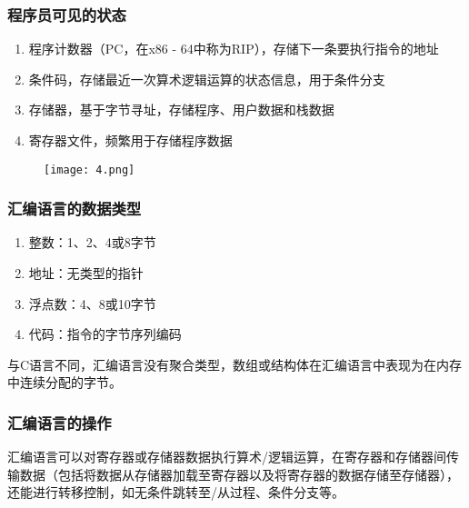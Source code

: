 \subsubsection{程序员可见的状态}
\begin{enumerate}
    \item 程序计数器（PC，在x86 - 64中称为RIP），存储下一条要执行指令的地址
    \item 条件码，存储最近一次算术逻辑运算的状态信息，用于条件分支
    \item 存储器，基于字节寻址，存储程序、用户数据和栈数据
    \item 寄存器文件，频繁用于存储程序数据
\end{enumerate}

\begin{figure}[H]
    \centering
    \captionsetup{skip=4pt}
    \texttt{[image: 4.png]}
    \caption{}
\end{figure}


\subsubsection{汇编语言的数据类型}
\begin{enumerate}
    \item 整数：1、2、4或8字节
    \item 地址：无类型的指针
    \item 浮点数：4、8或10字节
    \item 代码：指令的字节序列编码
\end{enumerate}
与C语言不同，汇编语言没有聚合类型，数组或结构体在汇编语言中表现为在内存中连续分配的字节。

\subsubsection{汇编语言的操作}
汇编语言可以对寄存器或存储器数据执行算术/逻辑运算，在寄存器和存储器间传输数据（包括将数据从存储器加载至寄存器以及将寄存器的数据存储至存储器），还能进行转移控制，如无条件跳转至/从过程、条件分支等。


